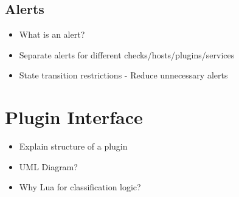 \documentclass[bsc,logo,twoside]{infthesis}
\begin{document}
\subsection{Alerts}
\begin{itemize}
	\item What is an alert?
	\item Separate alerts for different checks/hosts/plugins/services
	\item State transition restrictions - Reduce unnecessary alerts
\end{itemize}

\section{Plugin Interface}
\begin{itemize}
	\item Explain structure of a plugin
	\item UML Diagram?
	\item Why Lua for classification logic?
\end{itemize}
\end{document}
